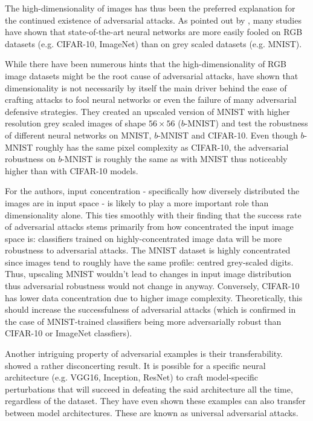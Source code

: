 The high-dimensionality of images has thus been the preferred explanation for the continued existence of adversarial attacks. As pointed out by \cite{shafahi2018adversarial}, many studies have shown that state-of-the-art neural networks are more easily fooled on RGB datasets (e.g. CIFAR-10, ImageNet) than on grey scaled datasets (e.g. MNIST).

While there have been numerous hints that the high-dimensionality of RGB image datasets might be the root cause of adversarial attacks, \cite{shafahi2018adversarial} have shown that dimensionality is not necessarily by itself the main driver behind the ease of crafting attacks to fool neural networks or even the failure of many adversarial defensive strategies. They created an upscaled version of MNIST with higher resolution grey scaled images of shape $56 \times 56$ ($b$-MNIST) and test the robustness of different neural networks on MNIST, $b$-MNIST and CIFAR-10. Even though $b$-MNIST roughly has the same pixel complexity as CIFAR-10, the adversarial robustness on $b$-MNIST is roughly the same as with MNIST thus noticeably higher than with CIFAR-10 models.


For the authors, input concentration - specifically how diversely distributed the images are in input space - is likely to play a more important role than dimensionality alone. This ties smoothly with their finding that the success rate of adversarial attacks stems primarily from how concentrated the input image space is: classifiers trained on highly-concentrated image data will be more robustness to adversarial attacks. The MNIST dataset is highly concentrated since images tend to roughly have the same profile: centred grey-scaled digits. Thus, upscaling MNIST wouldn't lead to changes in input image distribution thus adversarial robustness would not change in anyway. Conversely, CIFAR-10 has lower data concentration due to higher image complexity. Theoretically, this should increase the successfulness of adversarial attacks (which is confirmed in the case of MNIST-trained classifiers being more adversarially robust than CIFAR-10 or ImageNet classfiers).


Another intriguing property of adversarial examples is their transferability. \cite{moosavidezfooli2016universal} showed a rather disconcerting result. It is possible for a specific neural architecture (e.g. VGG16, Inception, ResNet) to craft model-specific perturbations that will succeed in defeating the said architecture all the time, regardless of the dataset. They have even shown these examples can also transfer between model architectures. These are known as universal adversarial attacks.



